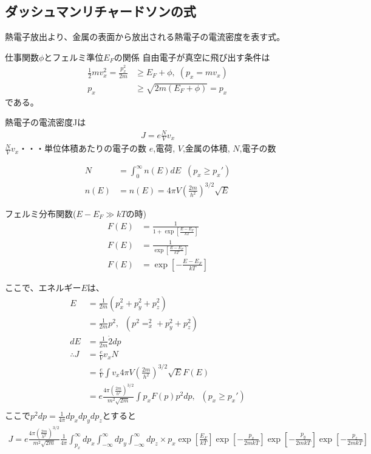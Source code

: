 \documentclass[12pt]{jsarticle}
\begin{document}
\renewcommand{\rmdefault}{ptm}
\renewcommand{\sfdefault}{phv}
\renewcommand{\ttdefault}{pcr}
\newcommand{\red}[1]{\textcolor{red}{#1}}
\normalfont
\renewcommand{\labelenumi}{(\arabic{enumi})}


\subsection{ダッシュマンリチャードソンの式}
熱電子放出より、金属の表面から放出される熱電子の電流密度を表す式。

仕事関数$\phi$とフェルミ準位$E_F$の関係
自由電子が真空に飛び出す条件は
\begin{align*}
\frac 1 2mv^2_x=\frac{p_x^2}{2m}&\ge E_F+\phi,\;(p_x=mv_x)\\
p_x&\ge \sqrt{2m(E_F+\phi)}=p_x
\end{align*}
である。

熱電子の電流密度Jは
\begin{align*}
J=e\frac NVv_x
\end{align*}
$\frac NVv_x$・・・単位体積あたりの電子の数
$e$,電荷,
$V$,金属の体積,
$N$,電子の数

\begin{align*}
N&=\int^\infty_0n(E)dE\;\;(p_x\ge p_x')\\
n(E)&=n(E)=4\pi V(\frac{2m}{h^2})^{3/2}\sqrt{E}
\end{align*}

フェルミ分布関数($E-E_F \gg kT$の時)
\begin{align*}
F(E)&=\frac 1{1+\exp{\left[\frac{E-E_F}{kT}\right]}}\\
F(E)&=\frac 1{\exp{\left[\frac{E-E_F}{kT}\right]}}\\
F(E)&=\exp{\left[-\frac{E-E_F}{kT}\right]}
\end{align*}

ここで、エネルギー$E$は、
\begin{align*}
E&=\frac 1{2m}(p_x^2+p_y^2+p_z^2)\\
&=\frac 1{2m}p^2,\;\;(p^2=_x^2+p_y^2+p_z^2)\\
dE&=\frac 1{2m}\dot 2dp\\
\therefore J&=\frac eVv_xN\\
&=\frac eV\int v_x4\pi V(\frac{2m}{h^2})^{3/2}\sqrt{E}F(E)\\
&=e\frac{4\pi(\frac{2m}{h^2})^{3/2}}{m^2\sqrt{2m}}\int p_xF(p)p^2dp,\;\;(p_x\ge p_x')\\
\end{align*}
ここで$p^2dp=\frac1{4\pi}dp_xdp_ydp_z$とすると
\begin{align*}
J=
e\frac{4\pi(\frac{2m}{h^2})^{3/2}}{m^2\sqrt{2m}}
\frac1{4\pi}
\int^\infty_{p_x}dp_x
\int^\infty_{-\infty}dp_y
\int^\infty_{-\infty}dp_z
\times p_x
\exp\left[\frac{E_F}{kT}\right]
\exp\left[-\frac{p_x}{2mkT}\right]
\exp\left[-\frac{p_y}{2mkT}\right]
\exp\left[-\frac{p_z}{2mkT}\right]
\end{align*}
\end{document}

